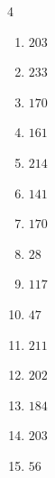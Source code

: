 \begin{multicols}{4}
\begin{enumerate}
  \item $203$


  \item $233$


\columnbreak %

\resetques

  \item $170$


  \item $161$


  \item $214$


  \item $141$


  \item $170$


  \item $28$


  \item $117$


  \item $47$


  \item $211$


  \item $202$


  \item $184$


  \item $203$


  \item $56$



\end{enumerate}
\end{multicols}
